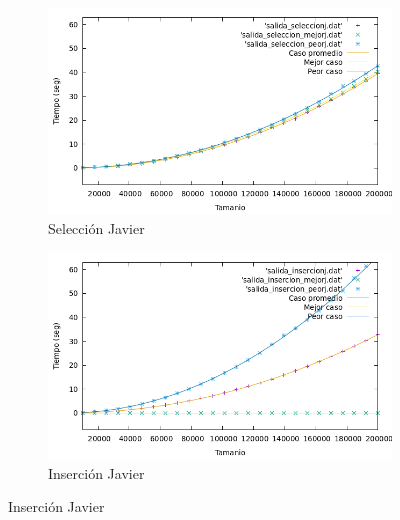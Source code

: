 \documentclass[10pt,a4paper]{article}
\begin{document}
\begin{figure}[h!]
	\begin{subfigure}{.5\textwidth}
		\centering
		\includegraphics[scale=0.3]{../../Images/Gráfica casos selección Javi5454.png}
		\caption{Selección Javier}
	\end{subfigure}
	\hfill
	\begin{subfigure}{.5\textwidth}
		\centering
		\includegraphics[scale=0.3]{../../Images/Gráfica inserción casos Javi5454.png}
		\caption{Inserción Javier}
	\end{subfigure}
\end{figure}
\end{document}
